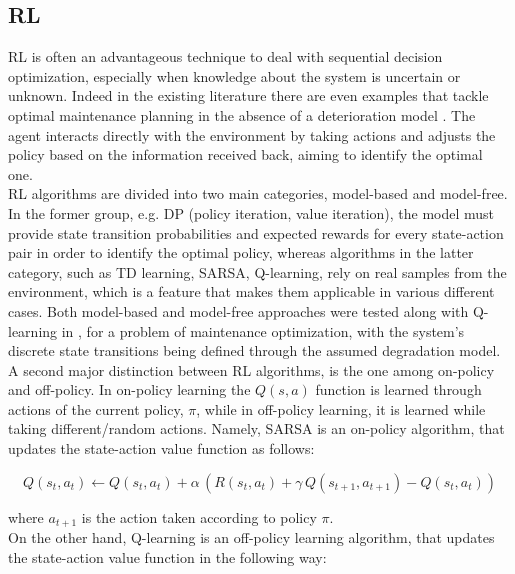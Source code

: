\subsection{\acrfull{RL}} \label{rlSec}

\gls{RL} is often an advantageous technique to deal with sequential decision optimization, especially when knowledge about the system is uncertain or unknown. Indeed in the existing literature there are even examples that tackle optimal maintenance planning in the absence of a deterioration model \cite{durango2004maintenance}. The agent interacts directly with the environment by taking actions and adjusts the policy based on the information received back, aiming to identify the optimal one. \\

\gls{RL} algorithms are divided into two main categories, model-based and model-free. In the former group, e.g. \gls{DP} (policy iteration, value iteration), the model must provide state transition probabilities and expected rewards for every state-action pair in order to identify the optimal policy, whereas algorithms in the latter category, such as \gls{TD} learning, SARSA, Q-learning, rely on real samples from the environment, which is a feature that makes them applicable in various different cases. Both model-based and model-free approaches were tested along with Q-learning in \cite{zhang2021model}, for a problem of maintenance optimization, with the system's discrete state transitions being defined through the assumed degradation model. \\

A second major distinction between \gls{RL} algorithms, is the one among on-policy and off-policy. In on-policy learning the $Q(s, a)$ function is learned through actions of the current policy, $\pi$, while in off-policy learning, it is learned while taking different/random actions. Namely, SARSA is an on-policy algorithm, that updates the state-action value function as follows:

\begin{equation}
    Q(s_t, a_t) \leftarrow Q(s_t,a_t) + \alpha \, \left( R(s_t, a_t) + \gamma \, Q(s_{t+1}, a_{t+1}) - Q(s_t, a_t) \right)
\end{equation}

where $a_{t+1}$ is the action taken according to policy $\pi$.\\

On the other hand, Q-learning is an off-policy learning algorithm, that updates the state-action value function in the following way:

